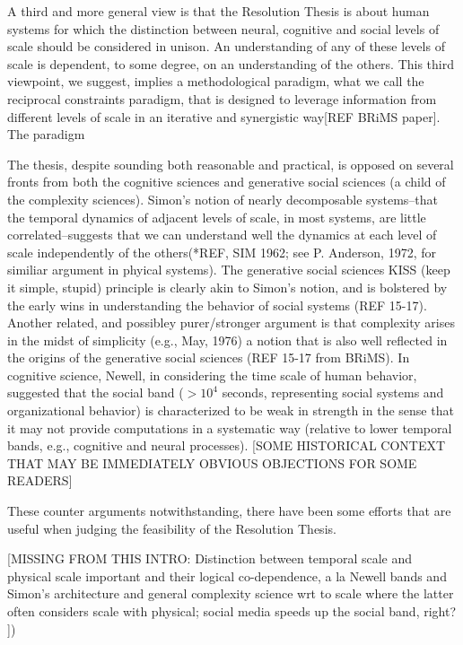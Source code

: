 \documentclass{article}
\begin{document}
A third and more general view is that the Resolution Thesis is about human systems for which the distinction between neural, cognitive and social levels of scale should be considered in unison.  An understanding of any of these levels of scale is dependent, to some degree, on an understanding of the others.  This third viewpoint, we suggest, implies a methodological paradigm, what we call the reciprocal constraints paradigm, that is designed to leverage information from different levels of scale in an iterative and synergistic way[REF BRiMS paper]. The paradigm


The thesis, despite sounding both reasonable and practical, is opposed on several fronts from both the cognitive sciences and generative social sciences (a child of the complexity sciences).  Simon's notion of nearly decomposable systems--that the temporal dynamics of adjacent levels of scale, in most systems, are little correlated--suggests that we can understand well the dynamics at each level of scale independently of the others(*REF, SIM 1962; see P. Anderson, 1972, for similiar argument in phyical systems).  The generative social sciences KISS (keep it simple, stupid) principle is clearly akin to Simon's notion, and is bolstered by the early wins in understanding the behavior of social systems (REF 15-17).   Another related, and possibley purer/stronger argument is that complexity arises in the midst of simplicity (e.g., May, 1976) a notion that is also well reflected in the origins of the generative social sciences (REF 15-17 from BRiMS).  In cognitive science, Newell, in considering the time scale of human behavior, suggested that the social band ($> 10^4$ seconds, representing social systems and organizational behavior) is characterized to be weak in strength in the sense that it may not provide computations in a systematic way (relative to lower temporal bands, e.g., cognitive and neural processes).  
[SOME HISTORICAL CONTEXT THAT MAY BE IMMEDIATELY OBVIOUS OBJECTIONS FOR SOME READERS]

These counter arguments notwithstanding, there have been some efforts that are useful when judging the feasibility of the Resolution Thesis.  



[MISSING FROM THIS INTRO:  Distinction between temporal scale and physical scale important and their logical co-dependence, a la Newell bands and Simon's architecture and general complexity science wrt to scale where the latter often considers scale with physical; social media speeds up the social band, right?   ])
\end{document}
